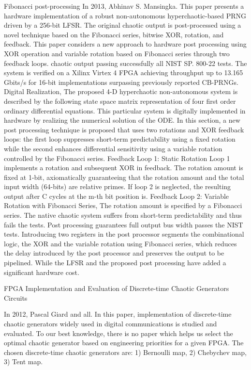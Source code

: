 Fibonacci post-processing
In 2013, Abhinav S. Mansingka. This paper presents a hardware implementation of a robust non-autonomous hyperchaotic-based PRNG driven by a 256-bit LFSR. The original chaotic output is post-processed using a novel technique based on the Fibonacci series, bitwise XOR, rotation, and feedback. This paper considers a new approach to hardware post processing using XOR operation and variable rotation based on Fibonacci series through two feedback loops. chaotic output passing successfully all NIST SP. 800-22 tests. The system is verified on a Xilinx Virtex 4 FPGA achieving throughput up to 13.165 Gbits/s for 16-bit implementations surpassing previously reported CB-PRNGs.  Digital Realization, The proposed 4-D hyperchaotic non-autonomous system is described by the following state space matrix representation of four first order ordinary differential equations. This particular system is digitally implemented in hardware by realizing the numerical solution of the ODE. In this section, a new post processing technique is proposed that uses two rotations and XOR feedback loops: the first loop suppresses short-term predictability using a fixed rotation while the second enhances differential sensitivity using a variable rotation controlled by the Fibonacci series. Feedback Loop 1: Static Rotation Loop 1 implements a rotation and subsequent XOR in feedback. The rotation amount is fixed at 1-bit, axiomatically guaranteeing that the rotation amount and the total input width (64-bits) are relative primes. If loop 2 is neglected, the resulting output after C cycles at the m-th bit position is. Feedback Loop 2: Variable Rotation with Fibonacci Series,  The rotation amount is specified by a Fibonacci series. The native chaotic system suffers from short-term predictability and thus fails the tests. Post processing guarantees full output bus width passes the NIST tests.  Introducing two registers in the post processor segments the combinational logic, the XOR and the variable rotation using Fibonacci series, which reduces the delay introduced by the post processor and preserves the output to be pipelined. While the LFSR and the proposed post processing have added a significant hardware cost.

FPGA Implementation and Evaluation of Discrete-time Chaotic Generators Circuits

In 2012, Pascal Giard and all. In this paper, implementation of discrete-time chaotic generators widely used in digital communications is studied and evaluated. To our best knowledge, there is no paper which helps us select the optimal chaotic generator based on engineering priorities for a given FPGA. The chosen discrete-time chaotic generators are: 1) Bernoulli map, 2) Chebychev map, 3) Tent map. 



